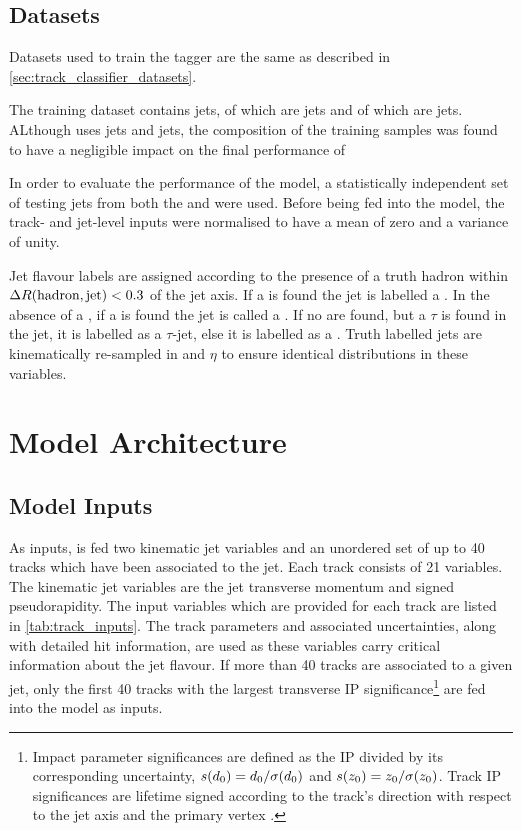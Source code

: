 \subsection{Datasets}\label{sec:datasets}

Datasets used to train the \GNN tagger are the same as described in \cref{sec:track_classifier_datasets}.

The training dataset contains \njetstrain jets,  of which are \ttbar jets and  of which are \Zprime jets.
ALthough \DLr uses  \ttbar jets and  \Zprime jets, the composition of the training samples was found to have a negligible impact on the final performance of \GNN

In order to evaluate the performance of the model, a statistically independent set of \njetsval testing jets from both the \ttbar and \Zprime were used.
Before being fed into the model, the track- and jet-level inputs were normalised to have a mean of zero and a variance of unity. 

Jet flavour labels are assigned according to the presence of a truth hadron within ${\Delta R(\text{hadron},\text{jet})<0.3}$ of the jet axis. If a \bhadron is found the jet is labelled a \bjet. In the absence of a \bhadron, if a \chadron is found the jet is called a \cjet.
If no \borchadrons are found, but a $\tau$ is found in the jet, it is labelled as a $\tau$-jet, else it is labelled as a \ljet.
Truth labelled \bcl jets are kinematically re-sampled in \pt and $\eta$ to ensure identical distributions in these variables.


\section{Model Architecture}\label{sec:networks}

\subsection{Model Inputs}\label{sec:model-inputs}

\newcommand{\ipdefsfootnote}{%
Impact parameter significances are defined as the IP divided by its corresponding uncertainty, $\dzerosig = d_0 / \dzerouncert$ and $\zzerosig = z_0 / \zzerouncert$.
Track IP significances are lifetime signed according to the track's direction with respect to the jet axis and the primary vertex \cite{PERF-2012-04}.
}

As inputs, \GNN is fed two kinematic jet variables and an unordered set of up to 40 tracks which have been associated to the jet.
Each track consists of 21 variables.
The kinematic jet variables are the jet transverse momentum and signed pseudorapidity.
The input variables which are provided for each track are listed in \cref{tab:track_inputs}.
The track parameters and associated uncertainties, along with detailed hit information, are used as these variables carry critical information about the jet flavour.
If more than 40 tracks are associated to a given jet, only the first 40 tracks with the largest transverse IP significance\footnote{\ipdefsfootnote} \dzerosig are fed into the model as inputs.

